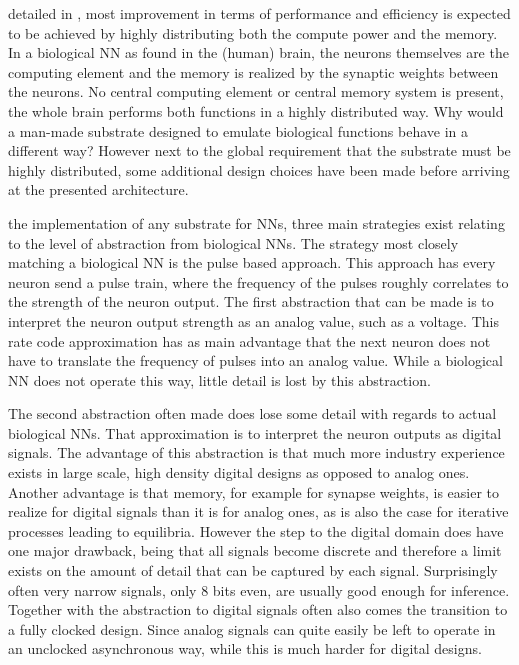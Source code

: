  detailed in , most improvement in terms of performance and efficiency is expected to be achieved by highly distributing both the compute power and the memory. In a biological \ac{NN} as found in the (human) brain, the neurons themselves are the computing element and the memory is realized by the synaptic weights between the neurons. No central computing element or central memory system is present, the whole brain performs both functions in a highly distributed way. Why would a man-made substrate designed to emulate biological functions behave in a different way? However next to the global requirement that the substrate must be highly distributed, some additional design choices have been made before arriving at the presented architecture.

 the implementation of any substrate for \acp{NN}, three main strategies exist relating to the level of abstraction from biological \acp{NN}. The strategy most closely matching a biological \ac{NN} is the pulse based approach. This approach has every neuron send a pulse train, where the frequency of the pulses roughly correlates to the strength of the neuron output. The first abstraction that can be made is to interpret the neuron output strength as an analog value, such as a voltage. This rate code approximation has as main advantage that the next neuron does not have to translate the frequency of pulses into an analog value. While a biological \ac{NN} does not operate this way, little detail is lost by this abstraction.

The second abstraction often made does lose some detail with regards to actual biological \acp{NN}. That approximation is to interpret the neuron outputs as digital signals. The advantage of this abstraction is that much more industry experience exists in large scale, high density digital designs as opposed to analog ones. Another advantage is that memory, for example for synapse weights, is easier to realize for digital signals than it is for analog ones, as is also the case for iterative processes leading to equilibria. However the step to the digital domain does have one major drawback, being that all signals become discrete and therefore a limit exists on the amount of detail that can be captured by each signal. Surprisingly often very narrow signals, only 8 bits even, are usually good enough for inference\cite{8192463}. Together with the abstraction to digital signals often also comes the transition to a fully clocked design. Since analog signals can quite easily be left to operate in an unclocked asynchronous way, while this is much harder for digital designs.

